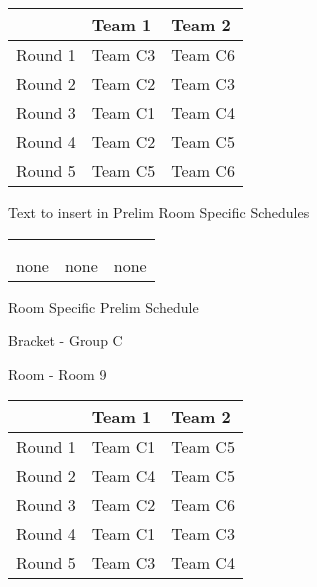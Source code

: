 \documentclass{article}%
\begin{document}
%
\begin{tabularx}{\textwidth}{|c|Y|Y|}%
\hline%
&Team 1&Team 2\\%
\hline%
Round 1&Team C3&Team C6\\%
Round 2&Team C2&Team C3\\%
Round 3&Team C1&Team C4\\%
Round 4&Team C2&Team C5\\%
Round 5&Team C5&Team C6\\%
\hline%
\end{tabularx}%
\vspace*{8pt}%
Text to insert in Prelim Room Specific Schedules%
\vspace*{30pt}%
\newline%
%
\begin{tabularx}{\textwidth}{YYY}%
  &  &  \\%
\\%
none&none&none\\%
\end{tabularx}%
\newpage%
\begin{center}%
\begin{Huge}%
Room Specific Prelim Schedule%
\end{Huge}%
\vspace*{8pt}%
\linebreak%
\begin{Large}%
Bracket {-} Group C%
\end{Large}%
\vspace*{8pt}%
\linebreak%
\vspace*{8pt}%
\begin{Large}%
Room {-} Room 9%
\end{Large}%
\end{center}%
%
\begin{tabularx}{\textwidth}{|c|Y|Y|}%
\hline%
&Team 1&Team 2\\%
\hline%
Round 1&Team C1&Team C5\\%
Round 2&Team C4&Team C5\\%
Round 3&Team C2&Team C6\\%
Round 4&Team C1&Team C3\\%
Round 5&Team C3&Team C4\\%
\hline%
\end{tabularx}%
\vspace*{8pt}%
\end{document}
